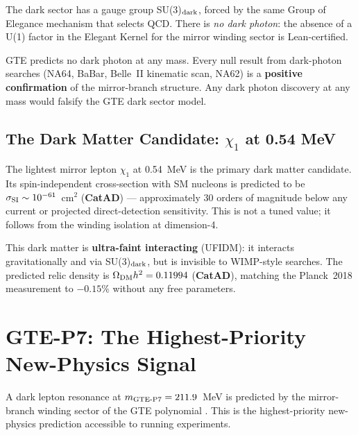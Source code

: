 \documentclass[11pt,a4paper]{article}
\newcommand{\term}[1]{\textbf{#1}}
\newcommand{\CatAD}{\textbf{CatAD}}
\begin{document}
The dark sector has a gauge group SU(3)$_{\rm dark}$, forced by the same
Group of Elegance mechanism that selects QCD.  There is \emph{no dark photon}:
the absence of a U(1) factor in the Elegant Kernel for the mirror winding sector
is Lean-certified.

\begin{tcolorbox}[colback=boxred,colframe=red!60!black,
  title={No Dark Photon (Lean-certified)}]
GTE predicts no dark photon at any mass.  Every null result from dark-photon
searches (NA64, BaBar, Belle~II kinematic scan, NA62) is a
\textbf{positive confirmation} of the mirror-branch structure.  Any dark photon
discovery at any mass would falsify the GTE dark sector model.
\end{tcolorbox}

\subsection[The Dark Matter Candidate: chi1 at 0.54 MeV]{The Dark Matter Candidate: $\chi_1$ at 0.54 MeV}

The lightest mirror lepton $\chi_1$ at 0.54~MeV is the primary dark matter
candidate.  Its spin-independent cross-section with SM nucleons is predicted
to be $\sigma_{\rm SI} \sim 10^{-61}$~cm$^2$ (\CatAD)
\cite{SpivackGTECompleteFramework} — approximately 30 orders of magnitude below
any current or projected direct-detection sensitivity.  This is not a tuned
value; it follows from the winding isolation at dimension-4.

This dark matter is \term{ultra-faint interacting} (UFIDM): it interacts
gravitationally and via SU(3)$_{\rm dark}$, but is invisible to WIMP-style
searches.  The predicted relic density is
$\Omega_{\rm DM} h^2 = 0.11994$ (\CatAD), matching the Planck~2018
measurement to $-0.15\%$ without any free parameters.

\section{GTE-P7: The Highest-Priority New-Physics Signal}
\label{sec:gtep7}

\begin{tcolorbox}[colback=boxyellow,colframe=orange!60!black,
  title={GTE-P7 Prediction (\CatAD) --- Belle II Target}]
A dark lepton resonance at $m_{\rm GTE\text{-}P7} = 211.9$~MeV is predicted
by the mirror-branch winding sector of the GTE polynomial
\cite{SpivackGTECompleteFramework}.  This is the highest-priority new-physics
prediction accessible to running experiments.
\end{tcolorbox}
\end{document}
